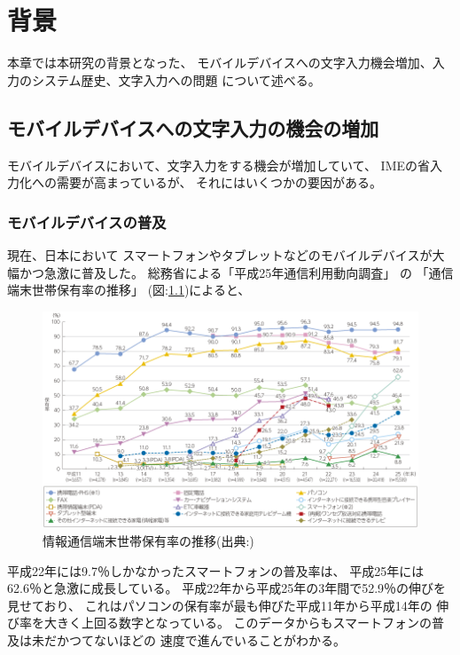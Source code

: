 \chapter{背景}
\label{chap:background}
本章では本研究の背景となった、
モバイルデバイスへの文字入力機会増加、入力のシステム歴史、文字入力への問題
について述べる。

\newpage
\section{モバイルデバイスへの文字入力の機会の増加}
モバイルデバイスにおいて、文字入力をする機会が増加していて、
IMEの省入力化への需要が高まっているが、
それにはいくつかの要因がある。

\subsection{モバイルデバイスの普及}
現在、日本において
スマートフォンやタブレットなどのモバイルデバイスが大幅かつ急激に普及した。
総務省による「平成25年通信利用動向調査」
\cite{communicationreport}の
「通信端末世帯保有率の推移」
(図:\ref{fig:mobiledevicespread})によると、
\begin{figure}[htbp]
  \begin{center}
    \includegraphics[width=160mm,bb=0 0 856 494]{images/mobiledevicespread.png}
    \caption{情報通信端末世帯保有率の推移(出典:\cite{communicationreport})}
    \label{fig:mobiledevicespread}
  \end{center}
\end{figure}
平成22年には9.7％しかなかったスマートフォンの普及率は、
平成25年には62.6％と急激に成長している。
平成22年から平成25年の3年間で52.9％の伸びを見せており、
これはパソコンの保有率が最も伸びた平成11年から平成14年の
伸び率を大きく上回る数字となっている。
このデータからもスマートフォンの普及は未だかつてないほどの
速度で進んでいることがわかる。

